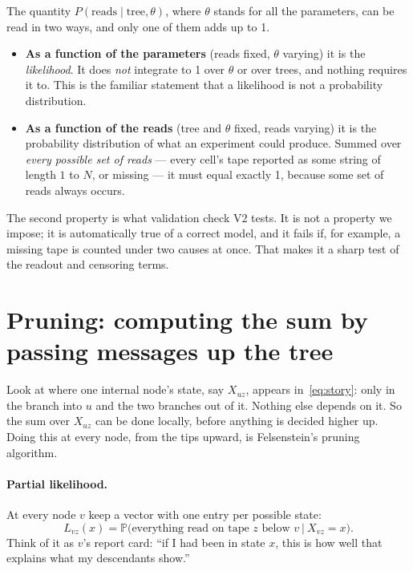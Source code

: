 \documentclass[11pt]{article}
\newcommand{\Prob}{\mathbb{P}}
\begin{document}
The quantity $P(\text{reads}\mid\text{tree},\theta)$, where $\theta$ stands for all the parameters,
can be read in two ways, and only one of them adds up to 1.
\begin{itemize}
\item \textbf{As a function of the parameters} (reads fixed, $\theta$ varying) it is the
  \emph{likelihood}. It does \emph{not} integrate to 1 over $\theta$ or over trees, and nothing
  requires it to. This is the familiar statement that a likelihood is not a probability
  distribution.
\item \textbf{As a function of the reads} (tree and $\theta$ fixed, reads varying) it is the
  probability distribution of what an experiment could produce. Summed over \emph{every possible set
  of reads} --- every cell's tape reported as some string of length $1$ to $N$, or missing --- it
  must equal exactly 1, because some set of reads always occurs.
\end{itemize}
The second property is what validation check V2 tests. It is not a property we impose; it is
automatically true of a correct model, and it fails if, for example, a missing tape is counted under
two causes at once. That makes it a sharp test of the readout and censoring terms.

\section{Pruning: computing the sum by passing messages up the tree}\label{sec:prune}

Look at where one internal node's state, say $X_{uz}$, appears in~\eqref{eq:story}: only in the
branch into $u$ and the two branches out of it. Nothing else depends on it. So the sum over $X_{uz}$
can be done locally, before anything is decided higher up. Doing this at every node, from the tips
upward, is Felsenstein's pruning algorithm.

\paragraph{Partial likelihood.} At every node $v$ keep a vector with one entry per possible state:
\begin{equation}
L_{vz}(x)=\Prob\big(\text{everything read on tape }z\text{ below }v\ \big|\ X_{vz}=x\big).
\end{equation}
Think of it as $v$'s report card: ``if I had been in state $x$, this is how well that explains what
my descendants show.''
\end{document}

